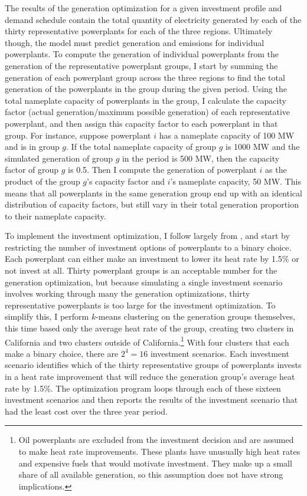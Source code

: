 The results of the generation optimization for a given investment profile and demand schedule contain the total quantity of electricity generated by each of the thirty representative powerplants for each of the three regions. Ultimately though, the model must predict generation and emissions for individual powerplants. To compute the generation of individual powerplants from the generation of the representative powerplant groups, I start by summing the generation of each powerplant group across the three regions to find the total generation of the powerplants in the group during the given period. Using the total nameplate capacity of powerplants in the group, I calculate the capacity factor (actual generation/maximum possible generation) of each representative powerplant, and then assign this capacity factor to each powerplant in that group. For instance, suppose powerplant $i$ has a nameplate capacity of 100 MW and is in group $g$. If the total nameplate capacity of group $g$ is 1000 MW and the simulated generation of group $g$ in the period is 500 MW, then the capacity factor of group $g$ is 0.5. Then I compute the generation of powerplant $i$ as the product of the group $g$'s capacity factor and $i$'s nameplate capacity, 50 MW. This means that all powerplants in the same generation group end up with an identical distribution of capacity factors, but still vary in their total generation proportion to their nameplate capacity. 

To implement the investment optimization, I follow largely from \cite{weber2021dynamic}, and start by restricting the number of investment options of powerplants to a binary choice. Each powerplant can either make an investment to lower its heat rate by 1.5\% or not invest at all. Thirty powerplant groups is an acceptable number for the generation optimization, but because simulating a single investment scenario involves working through many the generation optimizations, thirty representative powerplants is too large for the investment optimization. To simplify this, I perform $k$-means clustering on the generation groups themselves, this time based only the average heat rate of the group, creating two clusters in California and two clusters outside of California.\footnote{Oil powerplants are excluded from the investment decision and are assumed to make heat rate improvements. These plants have unusually high heat rates and expensive fuels that would motivate investment. They make up a small share of all available generation, so this assumption does not have strong implications.} With four clusters that each make a binary choice, there are $2^4 = 16$ investment scenarios. Each investment scenario identifies which of the thirty representative groups of powerplants invests in a heat rate improvement that will reduce the generation group's average heat rate by 1.5\%. The optimization program loops through each of these sixteen investment scenarios and then reports the results of the investment scenario that had the least cost over the three year period. 

